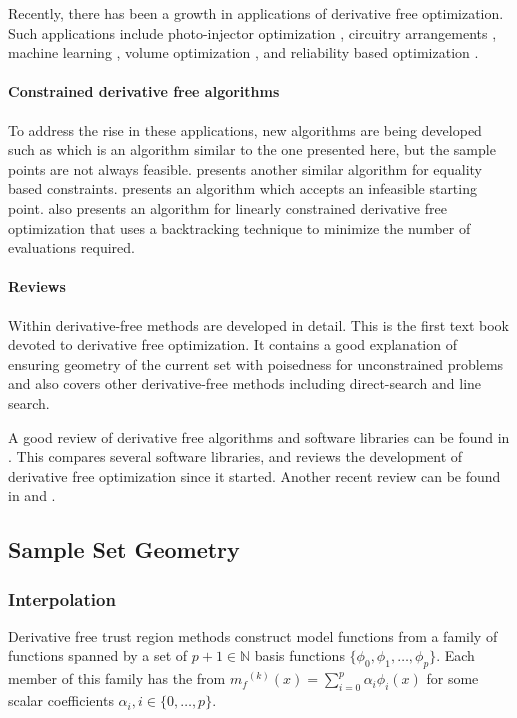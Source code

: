 \documentclass{article}
\theoremstyle{case}
\numberwithin{theorem}{subsection}
\newcommand{\mfk}{{{m}_f}^{(k)}}
\newcommand{\naturals}{\mathbb N}
\begin{document}
Recently, there has been a growth in applications of derivative free optimization.
Such applications include photo-injector optimization \cite{1742-6596-874-1-012062}, circuitry arrangements \cite{PLOSKAS201816}, machine learning \cite{KS2018}, volume optimization \cite{Cheng2017}, and reliability based optimization \cite{Gao2017}.

\paragraph{Constrained derivative free algorithms}
To address the rise in these applications, new algorithms are being developed such as \cite{doi:10.1080/10556788.2015.1026968} which is an algorithm similar to the one presented here, but the sample points are not always feasible.
\cite{Troltzsch2016} presents another similar algorithm for equality based constraints.
\cite{BAJAJ2018306} presents an algorithm which accepts an infeasible starting point.
\cite{Gao2018} also presents an algorithm for linearly constrained derivative free optimization that uses a backtracking technique to minimize the number of evaluations required.

\paragraph{Reviews}
Within \cite{introduction_book} derivative-free methods are developed in detail.
This is the first text book devoted to derivative free optimization.
It contains a good explanation of ensuring geometry of the current set with poisedness for unconstrained problems and also covers other derivative-free methods including direct-search and line search.

A good review of derivative free algorithms and software libraries can be found in \cite{miguel_review}.
This compares several software libraries, and reviews the development of derivative free optimization since it started.
Another recent review can be found in \cite{custodio_review2} and \cite{larson_menickelly_wild_2019}.


\subsection{Sample Set Geometry}
\subsubsection{Interpolation}
\label{interpolation}

Derivative free trust region methods construct model functions from a family of functions spanned by a set of $p + 1 \in \naturals$ basis functions  $\{\phi_0, \phi_1, \ldots, \phi_p\}$.
Each member of this family has the from $\mfk(x) = \sum_{i=0}^p\alpha_i\phi_i(x)$ for some scalar coefficients $\alpha_i, i \in \{0, \ldots, p\}$.
\end{document}
